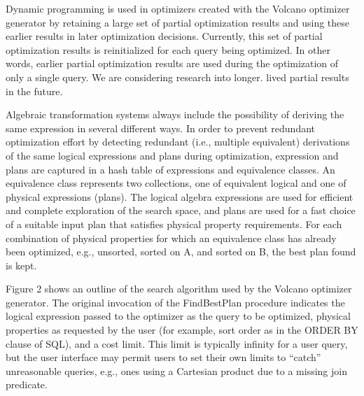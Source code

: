 \documentclass[a4paper,12pt,notitlepage,twoside,openright]{article}
\begin{document}
Dynamic programming is used in optimizers created with the Volcano
optimizer generator by retaining a large set of partial optimization
results and using these earlier results in later optimization decisions.
Currently, this set of partial optimization results is reinitialized for
each query being optimized. In other words, earlier partial optimization
results are used during the optimization of only a single query. We are
considering research into longer. lived partial results in the future.

Algebraic transformation systems always include the possibility of
deriving the same expression in several different ways. In order to
prevent redundant optimization effort by detecting redundant (i.e.,
multiple equivalent) derivations of the same logical expressions and
plans during optimization, expression and plans are captured in a hash
table of expressions and equivalence classes. An equivalence class
represents two collections, one of equivalent logical and one of
physical expressions (plans). The logical algebra expressions are used
for efficient and complete exploration of the search space, and plans
are used for a fast choice of a suitable input plan that satisfies
physical property requirements. For each combination of physical
properties for which an equivalence class has already been optimized,
e.g., unsorted, sorted on A, and sorted on B, the best plan found is
kept.

Figure 2 shows an outline of the search algorithm used by the Volcano
optimizer generator. The original invocation of the FindBestPlan
procedure indicates the logical expression passed to the optimizer as
the query to be optimized, physical properties as requested by the user
(for example, sort order as in the ORDER BY clause of SQL), and a cost
limit. This limit is typically infinity for a user query, but the user
interface may permit users to set their own limits to ``catch''
unreasonable queries, e.g., ones using a Cartesian product due to a
missing join predicate.
\end{document}
